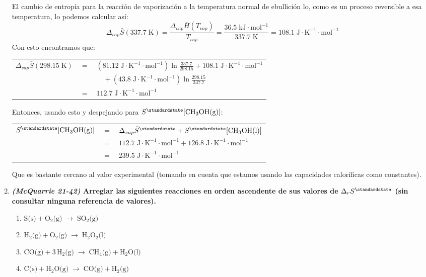 \documentclass[a4paper,12pt]{article}
\begin{document}
\begin{enumerate}
El cambio de entrop\'ia para la reacci\'on de vaporizaci\'on a la temperatura normal de ebullici\'on lo, como es un proceso reversible a esa temperatura, lo podemos calcular as\'i:
$$\Delta_{vap}\bar{S}(337.7\;\mbox{K})=\frac{\Delta_{vap}\bar{H}(T_{vap})}{T_{vap}}=\frac{36.5\;\mbox{kJ}\cdot\mbox{mol}^{-1}}{337.7\;\mbox{K}}=108.1\;\mbox{J}\cdot\mbox{K}^{-1}\cdot\mbox{mol}^{-1}$$
Con esto encontramos que: \\
\begin{center}
\begin{tabular}{r c l}
$\Delta_{vap}\bar{S}(298.15\;\mbox{K})$ & $=$ & $(81.12\;\mbox{J}\cdot\mbox{K}^{-1}\cdot\mbox{mol}^{-1})\ln\frac{337.7}{298.15}+108.1\;\mbox{J}\cdot\mbox{K}^{-1}\cdot\mbox{mol}^{-1}$ \\
& & $\quad+(43.8\;\mbox{J}\cdot\mbox{K}^{-1}\cdot\mbox{mol}^{-1})\ln\frac{298.15}{337.7}$ \\
& $=$ & $112.7\;\mbox{J}\cdot\mbox{K}^{-1}\cdot\mbox{mol}^{-1}$
\end{tabular}
\end{center}

Entonces, usando esto y despejando para $S^\standardstate[\mbox{CH}_3\mbox{OH(g)}]$: \\
\begin{center}
\begin{tabular}{r c l}
$S^\standardstate[\mbox{CH}_3\mbox{OH(g)}]$ & $=$ & $\Delta_{vap}\bar{S}^\standardstate+S^\standardstate[\mbox{CH}_3\mbox{OH(l)}]$ \\
& $=$ & $112.7\;\mbox{J}\cdot\mbox{K}^{-1}\cdot\mbox{mol}^{-1}+126.8\;\mbox{J}\cdot\mbox{K}^{-1}\cdot\mbox{mol}^{-1}$ \\
& $=$ & $239.5\;\mbox{J}\cdot\mbox{K}^{-1}\cdot\mbox{mol}^{-1}$
\end{tabular}
\end{center}

Que es bastante cercano al valor experimental (tomando en cuenta que estamos usando las capacidades calor\'ificas como constantes).

 \item \textbf{\textit{(McQuarrie 21-42)} Arreglar las siguientes reacciones en orden ascendente de sus valores de $\Delta_rS^\standardstate$ (sin consultar ninguna referencia de valores).}
 \begin{enumerate}
  \item $\mbox{S(s)}+\mbox{O}_2\mbox{(g)}\;\rightarrow\;\mbox{SO}_2\mbox{(g)}$
  \item $\mbox{H}_2\mbox{(g)}+\mbox{O}_2\mbox{(g)}\;\rightarrow\;\mbox{H}_2\mbox{O}_2\mbox{(l)}$
  \item $\mbox{CO(g)}+3\,\mbox{H}_2\mbox{(g)}\;\rightarrow\;\mbox{CH}_4\mbox{(g)}+\mbox{H}_2\mbox{O(l)}$
  \item $\mbox{C(s)}+\mbox{H}_2\mbox{O(g)}\;\rightarrow\;\mbox{CO(g)}+\mbox{H}_2\mbox{(g)}$
 \end{enumerate} %


\end{enumerate}
\end{document}
